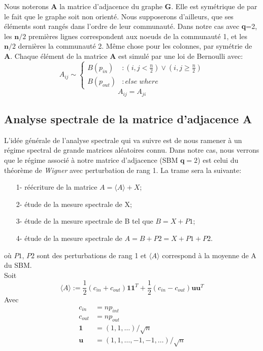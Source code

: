 Nous noterons \textbf{A} la matrice d'adjacence du graphe \textbf{G}.
Elle est symétrique de par le fait que le graphe soit non orienté.
Nous supposerons d'ailleurs, que ses éléments sont rangés dans l'ordre de leur communauté.
Dans notre cas avec \textbf{q}=2, les $\mathbf{n}/2$ premières lignes correspondent aux noeuds de la communauté 1, et les $\mathbf{n}/2$ dernières la communauté 2.
Même chose pour les colonnes, par symétrie de \textbf{A}.
Chaque élément de la matrice \textbf{A} est simulé par une loi de Bernoulli avec: 
\begin{equation} 
 A_{ij} \sim \left\{
  \begin{array}{lr}
    B(p_{in}) & : (i,j < \frac{n}{2}) \lor (i,j \ge \frac{n}{2}) \\
    B(p_{out}) & : else \; where
  \end{array}
\right.\nonumber
\end{equation}
\begin{equation} 
A_{ij} = A_{ji}\nonumber
\end{equation}


\subsection{Analyse spectrale de la matrice d'adjacence \textbf{A}}
L'idée générale de l'analyse spectrale qui va suivre est de nous ramener à un régime spectral de grande matrices aléatoires connu. 
Dans notre cas, nous verrons que le régime associé à notre matrice d'adjacence (SBM $\textbf{q}=2$) est celui du théorème de \textit{Wigner} avec perturbation de rang 1.
La trame sera la suivante:
\begin{itemize}
 	\item[1-] réécriture de la matrice $A = \langle A \rangle + X$;
 	\item[2-] étude de la mesure spectrale de X;
 	\item[3-] étude de la mesure spectrale de B tel que $B = X + P1$;
 	\item[4-] étude de la mesure spectrale de $A = B + P2 = X + P1 + P2$.
 \end{itemize} 
où $P1$, $P2$ sont des perturbations de rang 1 et $\langle A \rangle$ correspond à la moyenne de A du SBM.\\

Soit
\begin{equation} 
\langle A \rangle := \frac{1}{2}(c_{in} + c_{out})\mathbf{11}^T + \frac{1}{2}(c_{in} - c_{out})\mathbf{uu}^T
\end{equation}
Avec
\begin{align*}
c_{in} &= np_{int} \\
c_{out} &= np_{out}\\
\mathbf{1} &= (1, 1, \ldots)/\sqrt{n}\\
\mathbf{u} &= (1, 1, \ldots, -1, -1, \ldots)/\sqrt{n}
\end{align*}

